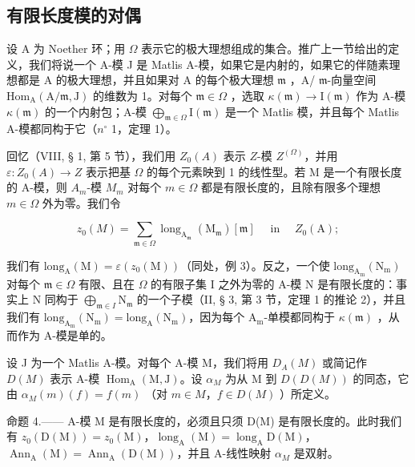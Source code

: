 \subsection{有限长度模的对偶}

设 A 为 Noether 环；用 \(\Omega\) 表示它的极大理想组成的集合。推广上一节给出的定义，我们将说一个 A-模 J 是 Matlis A-模，如果它是内射的，如果它的伴随素理想都是 A 的极大理想，并且如果对 A 的每个极大理想 \(\mathfrak{m}\) ，A/ \(\mathfrak{m}\)-向量空间 \(\mathrm{Hom}_{\mathrm{A}}(\mathrm{A}/\mathfrak{m},\mathrm{J})\) 的维数为 1。对每个 \(\mathfrak{m} \in \Omega\) ，选取 \(\kappa(\mathfrak{m}) \to \mathrm{I}(\mathfrak{m})\) 作为 A-模 \(\kappa(\mathfrak{m})\) 的一个内射包；A-模 \(\bigoplus_{\mathfrak{m} \in \Omega} \mathrm{I}(\mathfrak{m})\) 是一个 Matlis 模，并且每个 Matlis A-模都同构于它（\(n^{\circ}\) 1，定理 1）。

回忆（VIII, § 1, 第 5 节），我们用 \(Z_0(A)\) 表示 \(Z\)-模 \(Z^{(\Omega)}\)，并用 \(\varepsilon : Z_0(A) \to Z\) 表示把基 \(\Omega\) 的每个元素映到 1 的线性型。若 M 是一个有限长度的 A-模，则 \(A_m\)-模 \(M_m\) 对每个 \(m \in \Omega\) 都是有限长度的，且除有限多个理想 \(m \in \Omega\) 外为零。我们令

\[
z _ {0} (M) = \sum_ {\mathfrak {m} \in \Omega} \operatorname{long} _ {\mathrm{A} _ {\mathfrak {m}}} (\mathrm{M} _ {\mathfrak {m}}) [ \mathfrak {m} ] \quad \text { in } \quad Z _ {0} (\mathrm{A});
\]

我们有 \(\mathrm{long}_{\mathrm{A}}(\mathrm{M}) = \varepsilon(z_0(\mathrm{M}))\)（同处，例 3）。反之，一个使 \(\mathrm{long}_{\mathrm{A_m}}(\mathrm{N_m})\) 对每个 \(\mathfrak{m} \in \Omega\) 有限、且在 \(\Omega\) 的有限子集 I 之外为零的 A-模 N 是有限长度的：事实上 N 同构于 \(\bigoplus_{\mathfrak{m} \in I} \mathrm{N}_{\mathfrak{m}}\) 的一个子模（II, § 3, 第 3 节，定理 1 的推论 2），并且我们有 \(\mathrm{long}_{\mathrm{A_m}}(\mathrm{N_m}) = \mathrm{long}_\mathrm{A}(\mathrm{N_m})\)，因为每个 \(\mathrm{A_m}\)-单模都同构于 \(\kappa(\mathfrak{m})\) ，从而作为 A-模是单的。

设 J 为一个 Matlis A-模。对每个 A-模 M，我们将用 \(D_{A}(M)\) 或简记作 \(D(M)\) 表示 A-模 \(\operatorname{Hom}_{\mathrm{A}}(\mathrm{M},\mathrm{J})\)。设 \(\alpha_{M}\) 为从 M 到 \(D(D(M))\) 的同态，它由 \(\alpha_{M}(m)(f)=f(m)\) （对 \(m\in M\)，\(f\in D(M)\) ）所定义。

命题 4.—— A-模 M 是有限长度的，必须且只须 D(M) 是有限长度的。此时我们有 \(z_{0}(\mathrm{D}(\mathrm{M})) = z_{0}(\mathrm{M})\)，\(\operatorname{long}_{\mathrm{A}}(\mathrm{M}) = \operatorname{long}_{\mathrm{A}}\mathrm{D}(\mathrm{M})\)，\(\operatorname{Ann}_{\mathrm{A}}(\mathrm{M}) = \operatorname{Ann}_{\mathrm{A}}(\mathrm{D}(\mathrm{M}))\)，并且 A-线性映射 \(\alpha_{M}\) 是双射。

